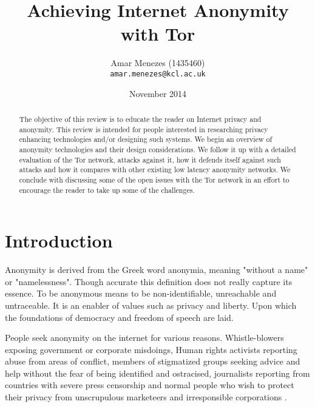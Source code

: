 \documentclass{llncs}
\begin{document}
\author{Amar Menezes (1435460)\\
\texttt{amar.menezes@kcl.ac.uk}}
\title{Achieving Internet Anonymity with Tor}
\date{November 2014}
\maketitle

\begin{abstract} 
	The objective of this review is to educate the reader on Internet privacy and anonymity. This review is intended for people interested in researching privacy enhancing technologies and/or designing such systems. We begin an overview of anonymity technologies and their design considerations. We follow it up with a detailed evaluation of the Tor network, attacks against it, how it defends itself against such attacks and how it compares with other existing low latency anonymity networks. We conclude with discussing some of the open issues with the Tor network in an effort to encourage the reader to take up some of the challenges. 
\end{abstract}

\section{Introduction} \label{intro}
Anonymity is derived from the Greek word anonymia, meaning "without a name" or "namelessness". Though accurate this definition does not really capture its essence. To be anonymous means to be non-identifiable, unreachable and untraceable. It is an enabler of values such as privacy and liberty. Upon which the foundations of democracy and freedom of speech are laid.

People seek anonymity on the internet for various reasons. Whistle-blowers exposing government or corporate misdoings, Human rights activists reporting abuse from areas of conflict, members of stigmatized groups seeking advice and help without the fear of being identified and ostracised, journalists reporting from countries with severe press censorship and normal people who wish to protect their privacy from unscrupulous marketeers and irresponsible corporations \cite{seekanonymity}.
\end{document}
